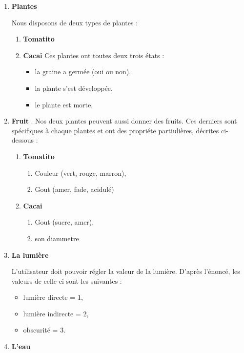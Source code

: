 \documentclass[a4paper,10pt]{article}
\begin{document}
\begin{enumerate}

\item \textbf{Plantes}

Nous disposons de  deux types de plantes :
\begin{enumerate}
 \item \textbf{Tomatito} 
\item \textbf{Cacai}
Ces plantes ont toutes deux trois états :
	\begin{itemize}
		\item la graine a germée (oui ou non),
		\item la plante s'est développée,
		\item le plante est morte.
	\end{itemize}
  
\end{enumerate}

\item \textbf{Fruit}
  .
Nos deux plantes peuvent aussi donner des fruits. Ces derniers sont spécifiques à chaque plantes et ont des propriéte partiulières, décrites ci-dessous :
\begin{enumerate}
 \item \textbf{Tomatito}
	\begin{enumerate}
		\item Couleur (vert, rouge, marron),
		\item Gout (amer, fade, acidulé)
	\end{enumerate}
 \item \textbf{Cacai}
		\begin{enumerate}
			\item Gout (sucre, amer),
			\item son diammetre
		\end{enumerate}
	\end{enumerate}

\item \textbf{La lumière}

L'utilisateur doit pouvoir régler la valeur de la lumière. D'après l'énoncé, les valeurs de celle-ci 
sont les suivantes :
	\begin{itemize}
	\item lumière directe = 1,
	\item lumière indirecte = 2,
	\item obscurité = 3.
	\end{itemize}

  \item \textbf{L'eau}


\end{enumerate}
\end{document}
